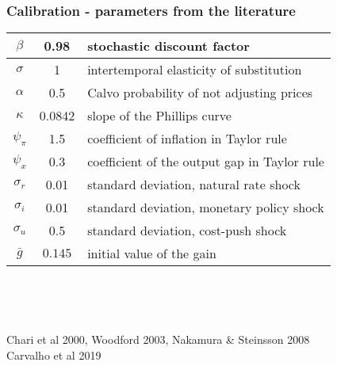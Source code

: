 \documentclass[10pt]{beamer}
\begin{document}
\begin{frame}
	\frametitle{Calibration - parameters from the literature}

\begin{center}
\begin{table}
\begin{tabular}{ c | c  | l }
\hline
 $\beta$ & 0.98 & stochastic discount factor \\  \hline
 $\sigma$ & 1  & intertemporal elasticity of substitution \\  \hline
 $\alpha$ & 0.5 &  Calvo probability of not adjusting prices \\\hline
 $\kappa$ & 0.0842 &  slope of the Phillips curve \\\hline
 $\psi_{\pi} $& 1.5  & coefficient of inflation in Taylor rule\\\hline
 $\psi_x$ & 0.3   & coefficient of the output gap in Taylor rule  \\\hline 
    $\sigma_r$ & 0.01 & standard deviation, natural rate shock  \\ \hline
    $\sigma_i$ &  0.01  &standard deviation, monetary policy shock  \\ \hline
    $\sigma_u$ & 0.5 & standard deviation, cost-push shock   \\ \hline  
 $\bar{g}$ & $0.145$  & initial value of the gain \\\hline 
   \end{tabular}     
   \label{calibration_lit}
 \end{table}
\end{center}

\

\

 Chari et al 2000, Woodford 2003, Nakamura \& Steinsson 2008 \\
 Carvalho et al 2019





\end{frame}

\end{document}
